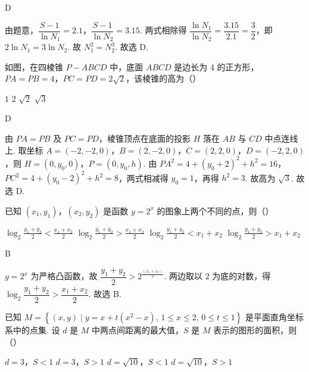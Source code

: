 \begin{answer}
D
\end{answer}

\begin{solution}
由题意，\(\dfrac{S-1}{\ln N_1}=2.1\)，\(\dfrac{S-1}{\ln N_2}=3.15\). 两式相除得 \(\dfrac{\ln N_1}{\ln N_2}=\dfrac{3.15}{2.1}=\dfrac32\)，即 \(2\ln N_1=3\ln N_2\). 故 \(N_1^2=N_2^3\). 故选 D.
\end{solution}

\begin{problem}
如图，在四棱锥 \(P-ABCD\) 中，底面 \(ABCD\) 是边长为 4 的正方形，\(PA=PB=4\)，\(PC=PD=2\sqrt{2}\)，该棱锥的高为（\quad）


\choices
    {\(1\)}
    {\(2\)}
    {\(\sqrt{2}\)}
    {\(\sqrt{3}\)}
\end{problem}

\begin{answer}
D
\end{answer}

\begin{solution}
由 \(PA=PB\) 及 \(PC=PD\)，棱锥顶点在底面的投影 \(H\) 落在 \(AB\) 与 \(CD\) 中点连线上. 取坐标 \(A=(-2,-2,0)\)，\(B=(2,-2,0)\)，\(C=(2,2,0)\)，\(D=(-2,2,0)\)，则 \(H=(0,y_0,0)\)，\(P=(0,y_0,h)\). 由 \(PA^2=4+(y_0+2)^2+h^2=16\)，\(PC^2=4+(y_0-2)^2+h^2=8\)，两式相减得 \(y_0=1\)，再得 \(h^2=3\). 故高为 \(\sqrt3\). 故选 D.
\end{solution}

\begin{problem}
已知 \((x_1,y_1)\)，\((x_2,y_2)\) 是函数 \(y=2^x\) 的图象上两个不同的点，则（\quad）

\choices
    {\(\log_2 \frac{y_1+y_2}{2}<\frac{x_1+x_2}{2}\)}
    {\(\log_2 \frac{y_1+y_2}{2}>\frac{x_1+x_2}{2}\)}
    {\(\log_2 \frac{y_1+y_2}{2}<x_1+x_2\)}
    {\(\log_2 \frac{y_1+y_2}{2}>x_1+x_2\)}
\end{problem}

\begin{answer}
B
\end{answer}

\begin{solution}
\(y=2^x\) 为严格凸函数，故 \(\dfrac{y_1+y_2}{2}>2^{\frac{(x_1+x_2)}{2}}\). 两边取以 \(2\) 为底的对数，得 \(\log_2\dfrac{y_1+y_2}{2}>\dfrac{x_1+x_2}{2}\). 故选 B.
\end{solution}

\begin{problem}
已知 \(M=\left\{ (x,y)\mid y=x+t\left( x^2-x \right),\,1\le x\le 2,\,0\le t\le 1 \right\}\) 是平面直角坐标系中的点集. 设 \(d\) 是 \(M\) 中两点间距离的最大值，\(S\) 是 \(M\) 表示的图形的面积，则（\quad）

\choices
    {\(d=3\)，\(S<1\)}
    {\(d=3\)，\(S>1\)}
    {\(d=\sqrt{10}\)，\(S<1\)}
    {\(d=\sqrt{10}\)，\(S>1\)}
\end{problem}

